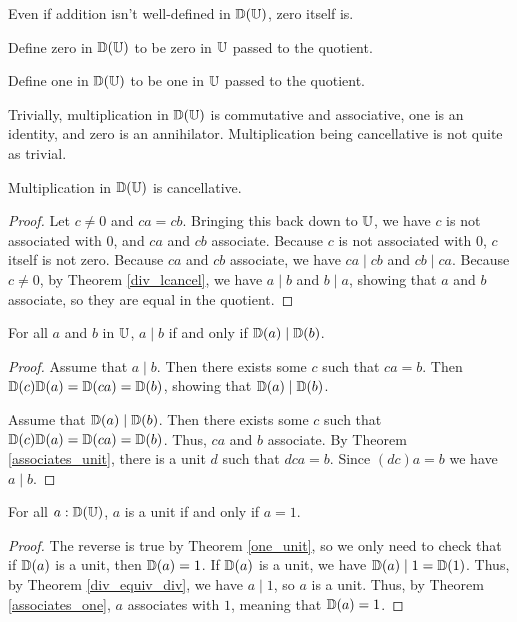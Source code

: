 \documentclass[../../math.tex]{subfiles}
\begin{document}
Even if addition isn't well-defined in $\mathbb{D}(\mathbb{U})$, zero itself is.

\begin{instance}
    Define zero in $\mathbb{D}(\mathbb{U})$ to be zero in $\mathbb{U}$ passed to the quotient.
\end{instance}

\begin{instance}
    Define one in $\mathbb{D}(\mathbb{U})$ to be one in $\mathbb{U}$ passed to the quotient.
\end{instance}

Trivially, multiplication in $\mathbb{D}(\mathbb{U})$ is commutative and associative, one is an
identity, and zero is an annihilator.  Multiplication being cancellative is not
quite as trivial.

\begin{instance}
    Multiplication in $\mathbb{D}(\mathbb{U})$ is cancellative.
\end{instance}
\begin{proof}
    Let $c \neq 0$ and $ca = cb$.  Bringing this back down to $\mathbb{U}$, we have $c$
    is not associated with $0$, and $ca$ and $cb$ associate.  Because $c$ is not
    associated with $0$, $c$ itself is not zero.  Because $ca$ and $cb$
    associate, we have $ca \mid cb$ and $cb \mid ca$.  Because $c \neq 0$, by
    Theorem \ref{div_lcancel}, we have $a \mid b$ and $b \mid a$, showing that
    $a$ and $b$ associate, so they are equal in the quotient.
\end{proof}

\begin{theorem} \label{div_equiv_div}
    For all $a$ and $b$ in $\mathbb{U}$, $a \mid b$ if and only if $\mathbb{D}(a) \mid \mathbb{D}(b)$.
\end{theorem}
\begin{proof}
    Assume that $a \mid b$.  Then there exists some $c$ such that $ca = b$.
    Then $\mathbb{D}(c) \mathbb{D}(a) = \mathbb{D}(ca) = \mathbb{D}(b)$, showing that $\mathbb{D}(a) \mid \mathbb{D}(b)$.

    Assume that $\mathbb{D}(a) \mid \mathbb{D}(b)$.  Then there exists some $c$ such that $\mathbb{D}(c)
    \mathbb{D}(a) = \mathbb{D}(ca) = \mathbb{D}(b)$.  Thus, $ca$ and $b$ associate.  By Theorem
    \ref{associates_unit}, there is a unit $d$ such that $dca = b$.  Since
    $(dc)a = b$ we have $a \mid b$.
\end{proof}

\begin{theorem} \label{div_equiv_unit}
    For all $a : \mathbb{D}(\mathbb{U})$, $a$ is a unit if and only if $a = 1$.
\end{theorem}
\begin{proof}
    The reverse is true by Theorem \ref{one_unit}, so we only need to check that
    if $\mathbb{D}(a)$ is a unit, then $\mathbb{D}(a) = 1$.  If $\mathbb{D}(a)$ is a unit, we have
    $\mathbb{D}(a) \mid 1 = \mathbb{D}(1)$.  Thus, by Theorem \ref{div_equiv_div}, we have $a
    \mid 1$, so $a$ is a unit.  Thus, by Theorem \ref{associates_one}, $a$
    associates with $1$, meaning that $\mathbb{D}(a) = 1$.
\end{proof}
\end{document}
